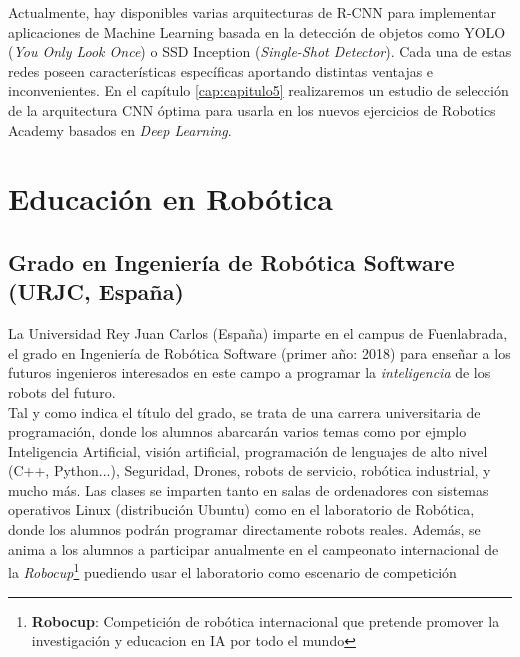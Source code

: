 Actualmente, hay disponibles varias arquitecturas de R-CNN para implementar aplicaciones de Machine Learning basada en la detección de objetos como YOLO (\textit{You Only Look Once}) o SSD Inception (\textit{Single-Shot Detector}). Cada una de estas redes poseen características específicas aportando distintas ventajas e inconvenientes. En el capítulo \ref{cap:capitulo5} realizaremos un estudio de selección de la arquitectura CNN óptima para usarla en los nuevos ejercicios de Robotics Academy basados en \textit{Deep Learning}.


\section{Educación en Robótica}
\label{sec:educacion_robotica}

\subsection{Grado en Ingeniería de Robótica Software (URJC, España)}
\label{subsec:grado_robotica_software}
La Universidad Rey Juan Carlos (España) imparte en el campus de Fuenlabrada, el grado en Ingeniería de Robótica Software (primer año: 2018) para enseñar a los futuros ingenieros interesados en este campo a programar la \textit{inteligencia} de los robots del futuro.\\

Tal y como indica el título del grado, se trata de una carrera universitaria de programación, donde los alumnos abarcarán varios temas como por ejmplo Inteligencia Artificial, visión artificial, programación de lenguajes de alto nivel (C++, Python...), Seguridad, Drones, robots de servicio, robótica industrial, y mucho más. Las clases se imparten tanto en salas de ordenadores con sistemas operativos Linux (distribución Ubuntu) como en el laboratorio de Robótica, donde los alumnos podrán programar directamente robots reales. Además, se anima a los alumnos a participar anualmente en el campeonato internacional de la \textit{Robocup}\footnote{\textbf{Robocup}: Competición de robótica internacional que pretende promover la investigación y educacion en IA por todo el mundo} puediendo usar el laboratorio como escenario de competición\\

